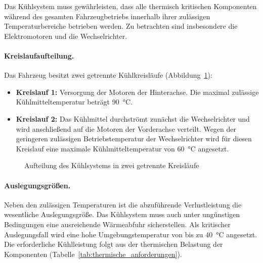 Das Kühlsystem muss gewährleisten, dass alle thermisch kritischen Komponenten
während des gesamten Fahrzeugbetriebs innerhalb ihrer zulässigen
Temperaturbereiche betrieben werden. Zu betrachten sind insbesondere die
Elektromotoren und die Wechselrichter.

\paragraph{Kreislaufaufteilung.}
Das Fahrzeug besitzt zwei getrennte Kühlkreisläufe
(Abbildung~\ref{fig:kreislaufaufteilung}):
\begin{itemize}
  \item \textbf{Kreislauf 1:} Versorgung der Motoren der Hinterachse.
        Die maximal zulässige Kühlmitteltemperatur beträgt \SI{90}{\celsius}.
  \item \textbf{Kreislauf 2:} Das Kühlmittel durchströmt zunächst die
        Wechselrichter und wird anschließend auf die Motoren der Vorderachse
        verteilt. Wegen der geringeren zulässigen Betriebstemperatur der
        Wechselrichter wird für diesen Kreislauf eine maximale
        Kühlmitteltemperatur von \SI{60}{\celsius} angesetzt.
\end{itemize}

\begin{figure}[htb]
  \centering
  \caption{Aufteilung des Kühlsystems in zwei getrennte Kreisläufe}
  \label{fig:kreislaufaufteilung}
\end{figure}

\paragraph{Auslegungsgrößen.}
Neben den zulässigen Temperaturen ist die abzuführende Verlustleistung die
wesentliche Auslegungsgröße. Das Kühlsystem muss auch unter ungünstigen
Bedingungen eine ausreichende Wärmeabfuhr sicherstellen. Als kritischer
Auslegungsfall wird eine hohe Umgebungstemperatur von bis zu
\SI{40}{\celsius} angesetzt. Die erforderliche Kühlleistung folgt aus der
thermischen Belastung der Komponenten (Tabelle~\ref{tab:thermische_anforderungen}).

